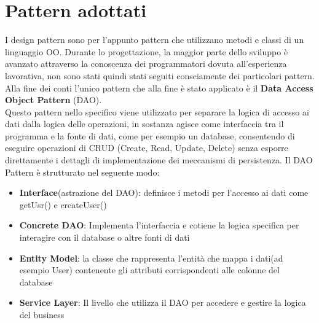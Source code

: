 \documentclass[a4paper, 11pt,oneside]{book}
\begin{document}
\chapter{Pattern adottati}
    I design pattern sono per l'appunto pattern che utilizzano metodi e classi di un linguaggio OO. Durante lo progettazione, la maggior parte dello sviluppo è avanzato attraverso la conoscenza dei programmatori dovuta all'esperienza lavorativa, non sono stati quindi stati seguiti consciamente dei particolari pattern. Alla fine dei conti l'unico pattern che alla fine è stato applicato è il \textbf{Data Access Object Pattern} (DAO). \\
    Questo pattern nello specifico viene utilizzato per separare la logica di accesso ai dati dalla logica delle operazioni, in sostanza agisce come interfaccia tra il programma e la fonte di dati, come per esempio un database, consentendo di eseguire operazioni di CRUD (Create, Read, Update, Delete) senza esporre direttamente
    i dettagli di implementazione dei meccanismi di persistenza. Il DAO Pattern è strutturato nel seguente modo:
    \begin{itemize}
        \item \textbf{Interface}(astrazione del DAO): definisce i metodi per l'accesso ai dati come getUsr() e createUser()
        \item \textbf{Concrete DAO}: Implementa l'interfaccia e cotiene la logica specifica per interagire con il database o altre fonti di dati
        \item \textbf{Entity Model}: la classe che rappresenta l'entità che mappa i dati(ad esempio User) contenente gli attributi corrispondenti alle colonne del database
        \item \textbf{Service Layer}: Il livello che utilizza il DAO per accedere e gestire la logica del business
    \end{itemize}
    
\end{document}
